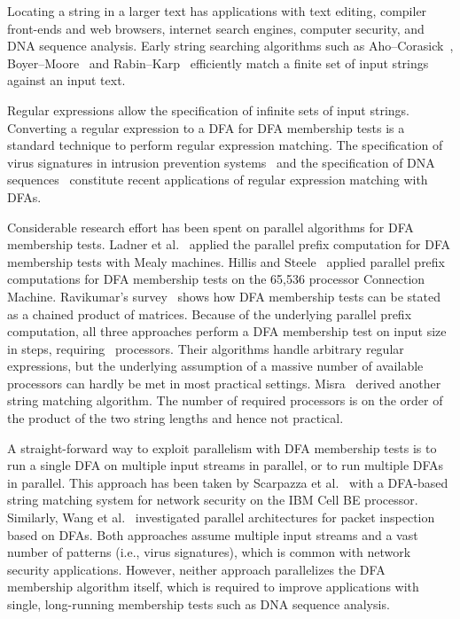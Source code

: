 \documentclass[10pt, conference, compsocconf]{IEEEtran}
\begin{document}
Locating a string in a larger text has applications
with text editing, compiler front-ends and web browsers,
internet search engines, computer security, and DNA sequence analysis.
Early string
searching algorithms such as Aho--Corasick~\cite{Aho:1975},
Boyer--Moore~\cite{Boyer:1977} and Rabin--Karp~\cite{Karp:1987}
efficiently match a finite set of input strings
against an input text.

Regular expressions allow the specification of
infinite sets of input strings.
Converting a regular expression to a DFA for DFA membership tests is a
standard technique to perform regular expression matching.
The specification of virus signatures in intrusion
prevention systems~\cite{Brumley2006,Sommer2003,Roesch1999} and
the specification of DNA
sequences~\cite{sigrist2010prosite,boeckmann2003swiss}
constitute recent applications of regular expression matching with DFAs.

Considerable research effort has been
spent on parallel algorithms for DFA membership tests.
Ladner et al.~\cite{Ladner:1980} applied the parallel prefix computation
for DFA membership tests with Mealy machines.
Hillis and Steele~\cite{Hillis:1986} applied parallel prefix computations
for DFA membership tests on the 65,536 processor Connection Machine.
Ravikumar's survey~\cite{ParallelFA1998} shows how DFA membership tests
can be stated as a chained product of matrices.
Because of the underlying parallel prefix computation, all three approaches
perform a DFA membership test on input size~
in  steps, requiring ~processors. Their algorithms
handle arbitrary
regular expressions, but the underlying assumption of a massive number
of available
processors can hardly be met in most practical settings.
Misra~\cite{Misra:2003} derived another  string
matching algorithm. The number of required processors is
on the order of the product of the two string lengths and hence not
practical.

A straight-forward way to exploit parallelism with DFA membership tests is
to run a single DFA on multiple input streams in parallel, or to run
multiple DFAs in parallel. This approach has been taken by
Scarpazza et al.~\cite{ScarpazzaVP07} with a DFA-based string matching
system for network security on the IBM Cell BE processor.
Similarly, Wang et
al.~\cite{WangHL10} investigated parallel architectures for packet
inspection based on DFAs. Both approaches assume multiple input streams
and a vast number of
patterns (i.e., virus signatures), which is common with network security
applications. However, neither
approach parallelizes the DFA membership algorithm itself, which is
required to improve
applications with single, long-running membership tests such as DNA
sequence analysis.
\end{document}
